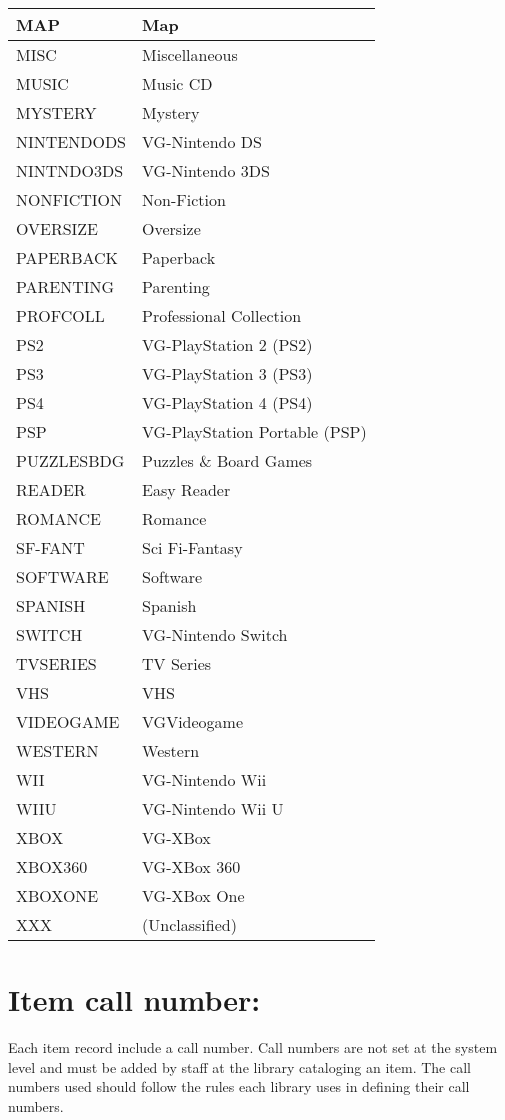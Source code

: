\documentclass[letterpaper,10pt,english]{sphinxmanual}
\begin{document}
\begin{savenotes}
\begin{longtable}{|l|l|}
\hline
MAP
&
Map
\\
\hline
MISC
&
Miscellaneous
\\
\hline
MUSIC
&
Music CD
\\
\hline
MYSTERY
&
Mystery
\\
\hline
NINTENDODS
&
VG-Nintendo DS
\\
\hline
NINTNDO3DS
&
VG-Nintendo 3DS
\\
\hline
NONFICTION
&
Non-Fiction
\\
\hline
OVERSIZE
&
Oversize
\\
\hline
PAPERBACK
&
Paperback
\\
\hline
PARENTING
&
Parenting
\\
\hline
PROFCOLL
&
Professional Collection
\\
\hline
PS2
&
VG-PlayStation 2 (PS2)
\\
\hline
PS3
&
VG-PlayStation 3 (PS3)
\\
\hline
PS4
&
VG-PlayStation 4 (PS4)
\\
\hline
PSP
&
VG-PlayStation Portable (PSP)
\\
\hline
PUZZLESBDG
&
Puzzles \& Board Games
\\
\hline
READER
&
Easy Reader
\\
\hline
ROMANCE
&
Romance
\\
\hline
SF-FANT
&
Sci Fi-Fantasy
\\
\hline
SOFTWARE
&
Software
\\
\hline
SPANISH
&
Spanish
\\
\hline
SWITCH
&
VG-Nintendo Switch
\\
\hline
TVSERIES
&
TV Series
\\
\hline
VHS
&
VHS
\\
\hline
VIDEOGAME
&
VG\textendash{}Videogame
\\
\hline
WESTERN
&
Western
\\
\hline
WII
&
VG-Nintendo Wii
\\
\hline
WIIU
&
VG-Nintendo Wii U
\\
\hline
XBOX
&
VG-XBox
\\
\hline
XBOX360
&
VG-XBox 360
\\
\hline
XBOXONE
&
VG-XBox One
\\
\hline
XXX
&
(Unclassified)
\\
\hline
\end{longtable}\sphinxatlongtableend\end{savenotes}


\section{Item call number:}
\label{\detokenize{classification:item-call-number}}
Each item record  include a call number. Call numbers are not
set at the system level and must be added by staff at the library
cataloging an item. The call numbers used should follow the rules each
library uses in defining their call numbers.
\end{document}
